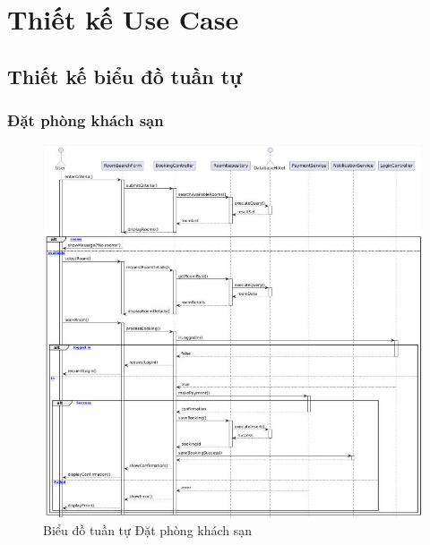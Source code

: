 \section{Thiết kế Use Case }

\subsection{Thiết kế biểu đồ tuần tự}
\subsubsection{Đặt phòng khách sạn}
\begin{figure}[H]
    \centering
    \includegraphics[width=\textwidth]{img3.4/timphong3.jpg} 
    \caption{Biểu đồ tuần tự Đặt phòng khách sạn}
\end{figure}

